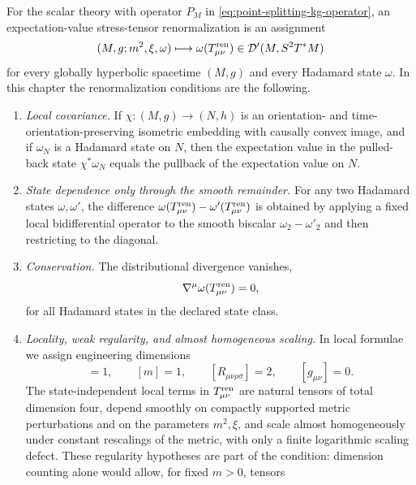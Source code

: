 \begin{definition}
\label{def:wald-type-stress-tensor-conditions}
For the scalar theory with operator \(P_M\) in
\eqref{eq:point-splitting-kg-operator}, an expectation-value stress-tensor
renormalization is an assignment
\[
  (M,g;m^2,\xi,\omega)\longmapsto
  \omega(T_{\mu\nu}^{\rm ren})
  \in\mathcal D'(M,S^2T^*M)
\]
for every globally hyperbolic spacetime \((M,g)\) and every Hadamard state
\(\omega\).  In this chapter the renormalization conditions are the
following.

\begin{enumerate}
\item \emph{Local covariance.}  If
\(\chi:(M,g)\to(N,h)\) is an orientation- and time-orientation-preserving
isometric embedding with causally convex image, and if \(\omega_N\) is a
Hadamard state on \(N\), then the expectation value in the pulled-back state
\(\chi^*\omega_N\) equals the pullback of the expectation value on \(N\).
\item \emph{State dependence only through the smooth remainder.}  For any
two Hadamard states \(\omega,\omega'\), the difference
\(\omega(T_{\mu\nu}^{\rm ren})-\omega'(T_{\mu\nu}^{\rm ren})\) is obtained
by applying a fixed local bidifferential operator to the smooth biscalar
\(\omega_2-\omega'_2\) and then restricting to the diagonal.
\item \emph{Conservation.}  The distributional divergence vanishes,
\begin{equation}
  \nabla^\mu\omega(T_{\mu\nu}^{\rm ren})=0 ,
  \label{eq:wald-type-conservation}
\end{equation}
for all Hadamard states in the declared state class.
\item \emph{Locality, weak regularity, and almost homogeneous scaling.}  In
local formulae we assign engineering dimensions
\begin{equation}
  [\nabla]=1,\qquad [m]=1,\qquad [R_{\mu\nu\rho\sigma}]=2,\qquad
  [g_{\mu\nu}]=0 .
  \label{eq:stress-tensor-engineering-dimensions}
\end{equation}
The state-independent local terms in \(T_{\mu\nu}^{\rm ren}\) are natural
tensors of total dimension four, depend smoothly on compactly supported
metric perturbations and on the parameters \(m^2,\xi\), and scale almost
homogeneously under constant rescalings of the metric, with only a finite
logarithmic scaling defect.  These regularity hypotheses are part of the
condition: dimension counting alone would allow, for fixed \(m>0\), tensors

\end{enumerate}
\end{definition}

